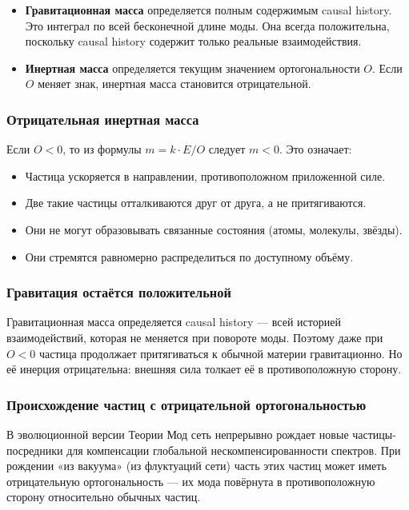 \documentclass[12pt,a4paper]{article}
\begin{document}
\begin{itemize}
    \item \textbf{Гравитационная масса} определяется полным содержимым causal history. Это интеграл по всей бесконечной длине моды. Она всегда положительна, поскольку causal history содержит только реальные взаимодействия.
    \item \textbf{Инертная масса} определяется текущим значением ортогональности $O$. Если $O$ меняет знак, инертная масса становится отрицательной.
\end{itemize}

\subsubsection{Отрицательная инертная масса}
Если $O < 0$, то из формулы $m = k \cdot E / O$ следует $m < 0$. Это означает:
\begin{itemize}
    \item Частица ускоряется в направлении, противоположном приложенной силе.
    \item Две такие частицы отталкиваются друг от друга, а не притягиваются.
    \item Они не могут образовывать связанные состояния (атомы, молекулы, звёзды).
    \item Они стремятся равномерно распределиться по доступному объёму.
\end{itemize}

\subsubsection{Гравитация остаётся положительной}
Гравитационная масса определяется causal history --- всей историей взаимодействий, которая не меняется при повороте моды. Поэтому даже при $O < 0$ частица продолжает притягиваться к обычной материи гравитационно. Но её инерция отрицательна: внешняя сила толкает её в противоположную сторону.

\subsubsection{Происхождение частиц с отрицательной ортогональностью}
В эволюционной версии Теории Мод сеть непрерывно рождает новые частицы-посредники для компенсации глобальной нескомпенсированности спектров. При рождении «из вакуума» (из флуктуаций сети) часть этих частиц может иметь отрицательную ортогональность --- их мода повёрнута в противоположную сторону относительно обычных частиц.
\end{document}
